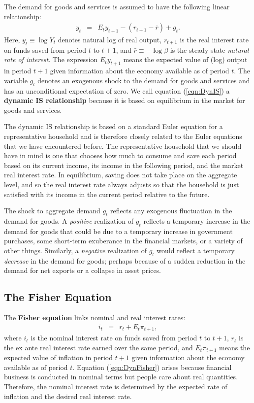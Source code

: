 \documentclass[12pt,fleqn]{article}
\newcommand{\EE}{\begin{eqnarray}}
\newcommand{\FF}{\end{eqnarray}}
\begin{document}
The demand for goods and services is assumed to have the following linear relationship:
	\EE
	y_t & = & E_t y_{t+1}  - \left( r_{t+1} - \bar{r}\right) + g_t. \label{eqn:DynIS}
	\FF
Here, $y_t\equiv \log Y_t$ denotes natural log of real output, $r_{t+1}$ is the real interest rate on funds saved from period $t$ to $t+1$, and $\bar{r} \equiv -\log \beta$ is the steady state \emph{natural rate of interest}. The expression $E_t y_{t+1}$ means the expected value of (log) output in period $t+1$ given information about the economy available as of period $t$. The variable $g_t$ denotes an exogenous shock to the demand for goods and services and has an unconditional expectation of zero. We call equation (\ref{eqn:DynIS}) a \textbf{dynamic IS relationship} because it is based on equilibrium in the market for goods and services.

The dynamic IS relationship is based on a standard Euler equation for a representative household and is therefore closely related to the Euler equations that we have encountered before. The representative household that we should have in mind is one that chooses how much to consume and save each period based on its current income, its income in the following period, and the market real interest rate. In equilibrium, saving does not take place on the aggregate level, and so the real interest rate always adjusts so that the household is just satisfied with its income in the current period relative to the future.

The shock to aggregate demand $g_t$ reflects any exogenous fluctuation in the demand for goods. A \emph{positive} realization of $g_t$ reflects a temporary increase in the demand for goods that could be due to a temporary increase in government purchases, some short-term exuberance in the financial markets, or a variety of other things. Similarly, a \emph{negative} realization of $g_t$ would reflect a temporary \emph{decrease} in the demand for goods; perhaps because of a sudden reduction in the demand for net exports or a collapse in asset prices.

\subsection{The Fisher Equation}

The \textbf{Fisher equation} links nominal and real interest rates:
	\EE
	i_{t} & = & r_{t} + E_t \pi_{t+1},  \label{eqn:DynFisher}
	\FF
where $i_{t}$ is the nominal interest rate on funds saved from period $t$ to $t+1$, $r_{t}$ is the ex ante real interest rate earned over the same period, and $E_t \pi_{t+1}$ means the expected value of inflation in period $t+1$ given information about the economy available as of period $t$. Equation (\ref{eqn:DynFisher}) arises because financial business is conducted in nominal terms but people care about real quantities. Therefore, the nominal interest rate is determined by the expected rate of inflation and the desired real interest rate.
\end{document}
